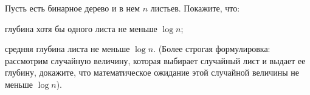 Пусть есть бинарное дерево и в нем $n$ листьев. Покажите, что:
\begin{enumcyr}
    \item глубина хотя бы одного листа не меньше $\log n$;
    \item средняя глубина листа не меньше $\log n$. (Более строгая формулировка: рассмотрим случайную величину, которая
	    выбирает случайный лист и выдает ее глубину, докажите, что математическое ожидание этой случайной величины не меньше
        $\log n$).
\end{enumcyr}